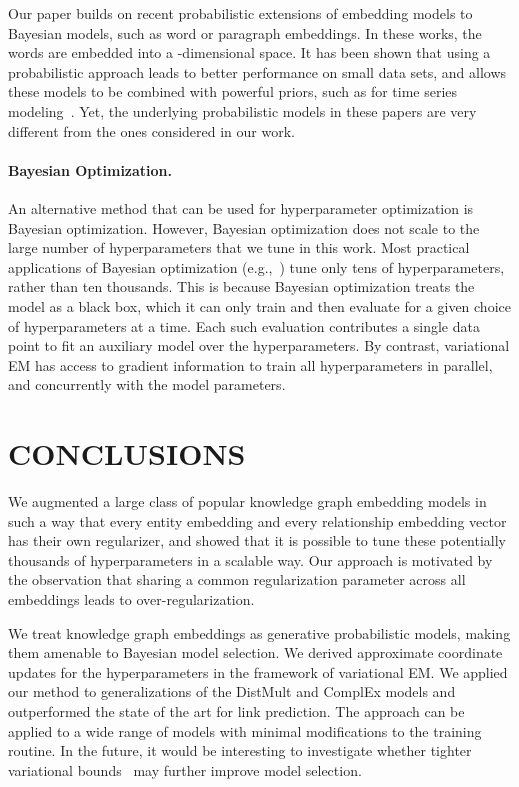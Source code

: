 \documentclass[letterpage]{article}
\begin{document}
Our paper builds on recent probabilistic extensions of embedding models to Bayesian models, such as word \citep{B2017} or paragraph \citep{JBSM2017} embeddings. In these works, the words are embedded into a -dimensional space. It has been shown that using a probabilistic approach leads to better performance on small data sets, and allows these models to be combined with powerful priors, such as for time series modeling~\citep{BM2017,bamler2018improving,JWKM2018}. Yet, the underlying probabilistic models in these papers are very different from the ones considered in our work.

\paragraph{Bayesian Optimization.}
An alternative method that can be used for hyperparameter optimization is Bayesian optimization.
However, Bayesian optimization does not scale to the large number of hyperparameters that we tune in this work.
Most practical applications of Bayesian optimization (e.g.,~\citep{snoek2012practical,wang2013bayesian}) tune only tens of hyperparameters, rather than ten thousands.
This is because Bayesian optimization treats the model as a black box, which it can only train and then evaluate for a given choice of hyperparameters at a time.
Each such evaluation contributes a single data point to fit an auxiliary model over the hyperparameters.
By contrast, variational EM has access to gradient information to train all hyperparameters in parallel, and concurrently with the model parameters.
 \section{CONCLUSIONS}
\label{sec:conclusions}

We augmented a large class of popular knowledge graph embedding models in such a way that every entity embedding and every relationship embedding vector has their own regularizer, and showed that it is possible to tune these potentially thousands of hyperparameters in a scalable way. Our approach is motivated by the observation that sharing a common regularization parameter across all embeddings leads to over-regularization.

We treat knowledge graph embeddings as generative probabilistic models, making them amenable to Bayesian model selection.
We derived approximate coordinate updates for the hyperparameters in the framework of variational EM.
We applied our method to generalizations of the DistMult and ComplEx models and outperformed the state of the art for link prediction. The approach
can be applied to a wide range of models with minimal modifications to the training routine. In the future, it would be interesting to investigate whether tighter variational bounds~\citep{burda2016importance,bamler2017perturbative} may further improve model selection.
 
\newpage




\end{document}
